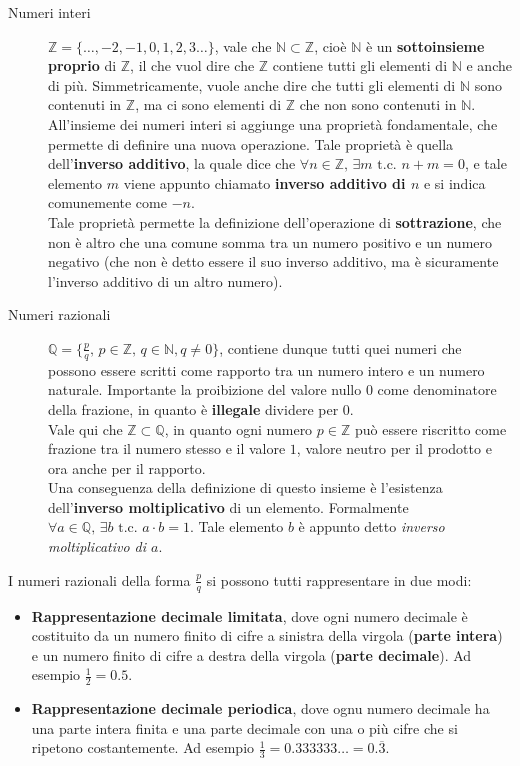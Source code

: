 \documentclass[12pt]{report}
\newcommand{\N}{\mathbb{N}}
\newcommand{\Z}{\mathbb{Z}}
\newcommand{\Q}{\mathbb{Q}}
\begin{document}
\begin{description}
		\item [Numeri interi] $\Z = \{\dots, -2, -1, 0, 1, 2, 3 \dots\}$, vale che $\N \subset \Z$, cioè $\N$ è un \textbf{sottoinsieme proprio} di $\Z$, il che vuol dire che $\Z$ contiene tutti gli elementi di $\N$ e anche di più. Simmetricamente, vuole anche dire che tutti gli elementi di $\N$ sono contenuti in $\Z$, ma ci sono elementi di $\Z$ che non sono contenuti in $\N$.\\
		All'insieme dei numeri interi si aggiunge una proprietà fondamentale, che permette di definire una nuova operazione. Tale proprietà è quella dell'\textbf{inverso additivo}, la quale dice che $\forall n\in \Z, \, \exists m \text{ t.c. } n + m = 0$, e tale elemento $m$ viene appunto chiamato \textbf{inverso additivo di $n$} e si indica comunemente come $-n$.\\
		Tale proprietà permette la definizione dell'operazione di \textbf{sottrazione}, che non è altro che una comune somma tra un numero positivo e un numero negativo (che non è detto essere il suo inverso additivo, ma è sicuramente l'inverso additivo di un altro numero).
		
		\item [Numeri razionali] $\Q = \{\frac{p}{q},\, p \in \Z,\, q \in \N, q \neq 0\}$, contiene dunque tutti quei numeri che possono essere scritti come rapporto tra un numero intero e un numero naturale. Importante la proibizione del valore nullo $0$ come denominatore della frazione, in quanto è \textbf{illegale} dividere per $0$. \\
		Vale qui che $\Z \subset \Q$, in quanto ogni numero $p \in \Z$ può essere riscritto come frazione tra il numero stesso e il valore $1$, valore neutro per il prodotto e ora anche per il rapporto.\\
		Una conseguenza della definizione di questo insieme è l'esistenza dell'\textbf{inverso moltiplicativo} di un elemento. Formalmente $\forall a\in \Q, \, \exists b \text{ t.c. } a \cdot b = 1$. Tale elemento $b$ è appunto detto \textit{inverso moltiplicativo di $a$}.
	
	\end{description}
	
	I numeri razionali della forma $\frac{p}{q}$ si possono tutti rappresentare in due modi:
	\begin{itemize}
		
		\item \textbf{Rappresentazione decimale limitata}, dove ogni numero decimale è costituito da un numero finito di cifre a sinistra della virgola (\textbf{parte intera}) e un numero finito di cifre a destra della virgola (\textbf{parte decimale}). Ad esempio $\frac{1}{2} = 0.5$.
		
		\item \textbf{Rappresentazione decimale periodica}, dove ognu numero decimale ha una parte intera finita e una parte decimale con una o più cifre che si ripetono costantemente. Ad esempio $\frac{1}{3} = 0.333333\dots = 0.\overline{3}$.
		
	\end{itemize}
	
\end{document}
